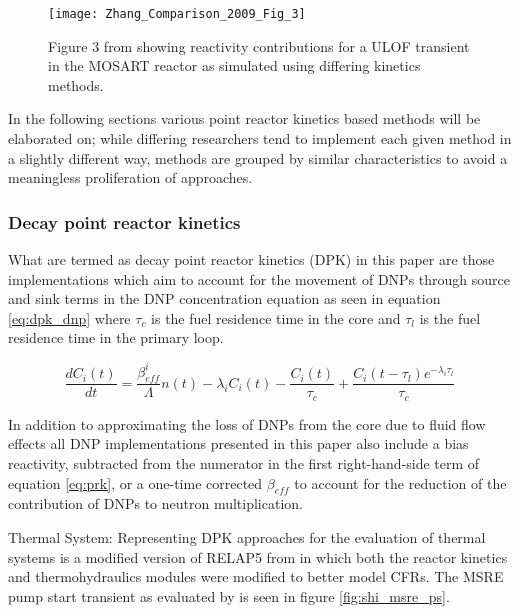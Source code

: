 \documentclass[review]{elsarticle}
\begin{document}
\begin{figure}[h]
   \centering
   \texttt{[image: Zhang\_Comparison\_2009\_Fig\_3]}
   \caption{Figure 3 from \cite{zhang_comparison_2009} showing reactivity contributions for a
   ULOF transient in the MOSART reactor as simulated using differing kinetics methods.} 
   \label{fig:zhang_prk_reac}
\end{figure}

In the following
sections various point reactor kinetics based methods will be elaborated on;
 while differing researchers
tend to implement each given method in a slightly different way, methods are
grouped by similar characteristics to avoid a meaningless proliferation of
approaches.

\subsubsection{Decay point reactor kinetics} \label{sssec:dpk}
What are termed as
decay point reactor kinetics (DPK) in this paper are those implementations
which aim to account for the movement of DNPs through source and sink terms
in the DNP concentration equation as seen in equation \ref{eq:dpk_dnp}
where $\tau_{c}$ is the fuel residence time in the core and $\tau_{l}$ is the
fuel residence time in the primary loop.

\begin{equation}
    \label{eq:dpk_dnp}
    \frac{dC_{i}(t)}{dt} = \frac{\beta_{eff}^{i}}{\Lambda} n(t) -
        \lambda_{i} C_{i}(t) - \frac{C_{i}(t)}{\tau_{c}} +
        \frac{C_{i}(t - \tau_{l}) e^{-\lambda_{i} \tau_{l}}}{\tau_{c}}
\end{equation}

In addition to approximating the loss of DNPs from the core due to fluid
flow effects all DNP implementations presented in this paper also include
a bias reactivity, subtracted from the numerator in the first right-hand-side
term of equation \ref{eq:prk}, or a one-time corrected $\beta_{eff}$ to account
for the reduction of the contribution of DNPs to neutron multiplication.

\par Thermal System: Representing DPK approaches for the evaluation of thermal
systems is a modified version of RELAP5 from \cite{shi_development_2016} in
which both the reactor kinetics and thermohydraulics modules were modified
to better model CFRs. The MSRE pump start transient as evaluated by
\cite{shi_development_2016} is seen in figure \ref{fig:shi_msre_ps}.
\end{document}
